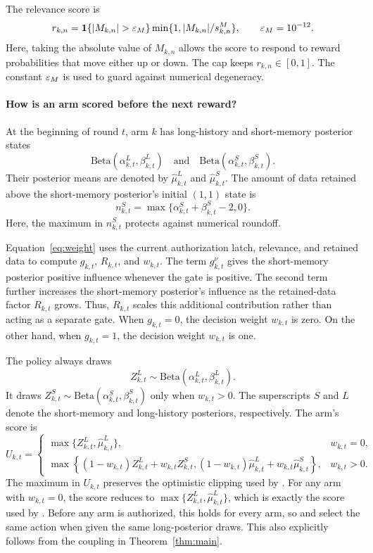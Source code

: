 The relevance score is
\begin{equation}
 r_{k,n}
 =
 \1\{|M_{k,n}|>\epsM\}
 \min\{1,|M_{k,n}|/s^M_{k,n}\},
 \qquad
 \epsM=10^{-12}.
 \label{eq:ramp}
\end{equation}
Here, taking the absolute value of $M_{k,n}$ allows the score to respond to reward probabilities that move either up or down.
The cap keeps $r_{k,n}\in[0,1]$.
The constant $\varepsilon_M$ is used to guard against numerical degeneracy.

\paragraph{How is an arm scored before the next reward?}
At the beginning of round $t$, arm $k$ has long-history and short-memory posterior states
\[
 \mathrm{Beta}(\alpha^L_{k,t},\beta^L_{k,t})
 \quad\text{and}\quad
 \mathrm{Beta}(\alpha^S_{k,t},\beta^S_{k,t}).
\]
Their posterior means are denoted by
$\widehat\mu^L_{k,t}$ and $\widehat\mu^S_{k,t}$.
The amount of data retained above the short-memory posterior's initial $(1,1)$ state is
\[
 n^S_{k,t}
 =
 \max\{\alpha^S_{k,t}+\beta^S_{k,t}-2,0\}.
\]
Here, the maximum in $n^S_{k,t}$ protects against numerical roundoff.

Equation~\eqref{eq:weight} uses the current authorization latch, relevance, and
retained data to compute $g_{k,t}$, $R_{k,t}$, and $w_{k,t}$.
The term $g_{k,t}^{\nu}$ gives the short-memory posterior positive influence whenever the gate is positive.
The second term further increases the short-memory posterior's influence as the retained-data factor $R_{k,t}$ grows.
Thus, $R_{k,t}$ scales this additional contribution rather than acting as a separate gate.
When $g_{k,t}=0$, the decision weight $w_{k,t}$ is zero.
On the other hand, when $g_{k,t}=1$, the decision weight $w_{k,t}$ is one.

The policy always draws
\[
 Z^L_{k,t}
 \sim
 \mathrm{Beta}(\alpha^L_{k,t},\beta^L_{k,t}).
\]
It draws
$Z^S_{k,t}\sim
\mathrm{Beta}(\alpha^S_{k,t},\beta^S_{k,t})$
only when $w_{k,t}>0$. The superscripts $S$ and $L$ denote the short-memory and long-history posteriors, respectively.
The arm's score is
\begin{equation}
 U_{k,t}
 =
 \begin{cases}
 \max\{Z^L_{k,t},\widehat\mu^L_{k,t}\},
 & w_{k,t}=0,\\[3pt]
 \max\!\left\{
 (1-w_{k,t})Z^L_{k,t}+w_{k,t}Z^S_{k,t},
 (1-w_{k,t})\widehat\mu^L_{k,t}
 +w_{k,t}\widehat\mu^S_{k,t}
 \right\},
 & w_{k,t}>0.
 \end{cases}
 \label{eq:score}
\end{equation}
The maximum in $U_{k,t}$ preserves the optimistic clipping used by \anchor{}.
For any arm with $w_{k,t}=0$, the score reduces to $\max\{Z^L_{k,t},\widehat\mu^L_{k,t}\}$, which is exactly the score used by
\anchor{}.
Before any arm is authorized, this holds for every arm, so \method{} and \anchor{} select the same action when
given the same long-posterior draws.
This also explicitly follows from the coupling in Theorem~\ref{thm:main}.

